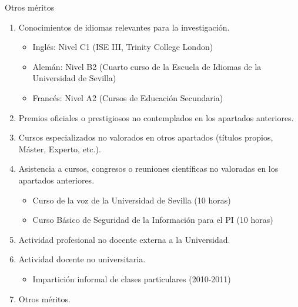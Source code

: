 \documentclass{resume2} %
\begin{document}
\begin{rSection}{Otros méritos}

\begin{enumerate}[label=\alph*.]
\item Conocimientos de idiomas relevantes para la investigaci\'on.

\begin{itemize}
\item Ingl\'es: Nivel C1 (ISE III, Trinity College London)
\item Alem\'an: Nivel B2 (Cuarto curso de la Escuela de Idiomas de la Universidad de Sevilla)
\item Franc\'es: Nivel A2 (Cursos de Educaci\'on Secundaria)
\end{itemize}

\item Premios oficiales o prestigiosos no contemplados en los apartados anteriores.

\item Cursos especializados no valorados en otros apartados (t\'itulos propios, M\'aster, Experto, etc.).

\item Asistencia a cursos, congresos o reuniones cient\'ificas no valoradas en los apartados anteriores.

\begin{itemize}
\item Curso de la voz de la Universidad de Sevilla (10 horas)
\item Curso Básico de Seguridad de la Información para el PI (10 horas)
\end{itemize}

\item Actividad profesional no docente externa a la Universidad.

\item Actividad docente no universitaria.
\begin{itemize}
\item Impartici\'on informal de clases particulares (2010-2011)
\end{itemize}


\item Otros méritos.

\end{enumerate}

\end{rSection}
\end{document}
